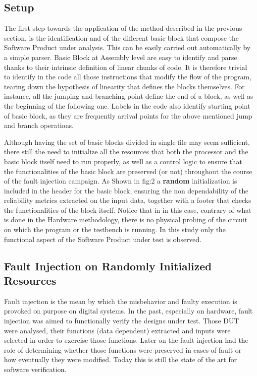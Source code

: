 \documentclass[./dissertation.tex]{subfiles}
\begin{document}
\subsection{Setup}
The first step towards the application of the method described in the previous section, is the identification and of the different basic block that compose the Software Product under analysis. This can be easily carried out automatically by a simple parser. Basic Block at Assembly level are easy to identify and parse thanks to their intrinsic definition of linear chunks of code. It is therefore trivial to identify in the code all those instructions that modify the flow of the program, tearing down the hypothesis of linearity that defines the blocks themselves. For instance, all the jumping and branching point define the end of a block, as well as the beginning of the following one. Labels in the code also identify starting point of basic block, as they are frequently arrival points for the above mentioned jump and branch operations.

Although having the set of basic blocks divided in single file may seem sufficient, there still the need to initialize all the resources that both the processor and the basic block itself need to run properly, as well as a control logic to ensure that the functionalities of the basic block are preserved (or not) throughout the course of the fault injection campaign. As Shown in fig:2 a \textbf{random} initialization is included in the header for the basic block, ensuring the non dependability of the reliability metrics extracted on the input data, together with a footer that checks the functionalities of the block itself. Notice that in in this case, contrary of what is done in the Hardware methodology, there is no physical probing of the circuit on which the program or the testbench is running. In this study only the functional aspect of the Software Product under test is observed.



\subsection{Fault Injection on Randomly Initialized Resources}

Fault injection is the mean by which the misbehavior and faulty execution is provoked on purpose on digital systems. In the past, especially on hardware, fault injection was aimed to functionally verify the designs under test. Those DUT were analysed, their functions (data dependent) extracted and inputs were selected in order to exercise those functions. Later on the fault injection had the role of determining whether those functions were preserved in cases of fault or how eventually they were modified. Today this is still the state of the art for software verification.
\end{document}
